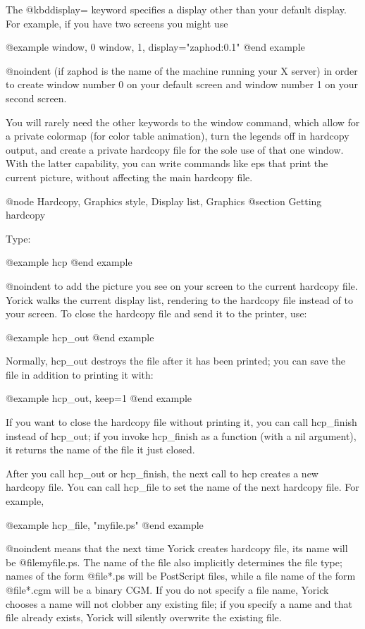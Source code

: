 The @kbd{display=} keyword specifies a display other than your default
display.  For example, if you have two screens you might use

@example
window, 0
window, 1, display="zaphod:0.1"
@end example

@noindent
(if zaphod is the name of the machine running your X server) in order
to create window number 0 on your default screen and window number 1
on your second screen.

You will rarely need the other keywords to the window command, which
allow for a private colormap (for color table animation), turn the
legends off in hardcopy output, and create a private hardcopy file for
the sole use of that one window.  With the latter capability, you can
write commands like eps that print the current picture, without
affecting the main hardcopy file.

@node Hardcopy, Graphics style, Display list, Graphics
@section Getting hardcopy

Type:

@example
hcp
@end example

@noindent
to add the picture you see on your screen to the current hardcopy file.
Yorick walks the current display list, rendering to the hardcopy file
instead of to your screen.  To close the hardcopy file and send it to
the printer, use:

@example
hcp_out
@end example

Normally, hcp_out destroys the file after it has been printed; you
can save the file in addition to printing it with:

@example
hcp_out, keep=1
@end example

If you want to close the hardcopy file without printing it, you can
call hcp_finish instead of hcp_out; if you invoke hcp_finish as a
function (with a nil argument), it returns the name of the file it
just closed.

After you call hcp_out or hcp_finish, the next call to hcp creates a
new hardcopy file.  You can call hcp_file to set the name of the next
hardcopy file.  For example,

@example
hcp_file, "myfile.ps"
@end example

@noindent
means that the next time Yorick creates hardcopy file, its name will
be @file{myfile.ps}.  The name of the file also implicitly determines
the file type; names of the form @file{*.ps} will be PostScript files,
while a file name of the form @file{*.cgm} will be a binary CGM.  If
you do not specify a file name, Yorick chooses a name will not clobber
any existing file; if you specify a name and that file already exists,
Yorick will silently overwrite the existing file.

